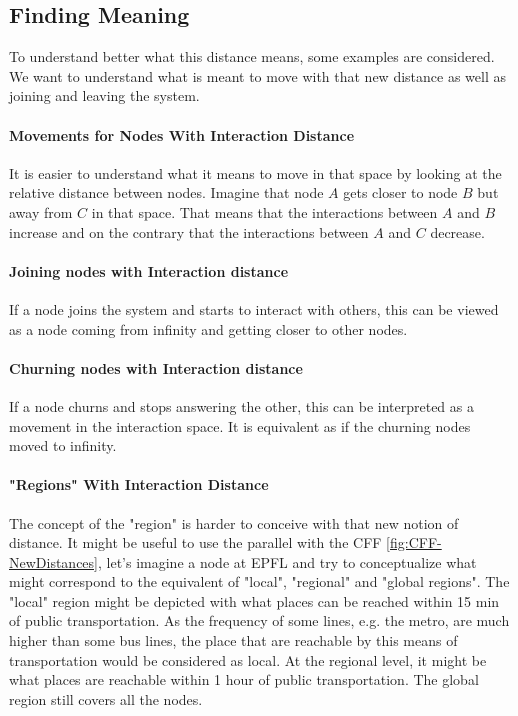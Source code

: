 \documentclass[a4paper,11pt,twoside=semi,openright]{report}
\begin{document}
\subsection{Finding Meaning}
To understand better what this distance means, some examples are
considered. We want to understand what is meant to move with that new distance as
well as joining and leaving the system. 

\paragraph{Movements for Nodes With Interaction Distance}
It is easier to understand what it means to move in that space by looking at
the relative distance between nodes. Imagine that node $A$ gets closer to node
$B$ but away from $C$ in that space. That means that the interactions between
$A$ and $B$ increase and on the contrary that the interactions between $A$ and
$C$ decrease.

\paragraph{Joining nodes with Interaction distance}
If a node joins the system and starts to interact with others, this can be
viewed as a node coming from infinity and getting closer to other
nodes.

\paragraph{Churning nodes with Interaction distance}
If a node churns and stops answering the other, this can be interpreted as a
movement in the interaction space. It is equivalent as if the churning nodes moved
to infinity.  

\paragraph{"Regions" With Interaction Distance} \label{par:section-example}
The concept of the "region" is harder to conceive with that new notion of
distance. It might be useful to use the parallel with the CFF
\autoref{fig:CFF-NewDistances}, let's imagine a node at EPFL and try to
conceptualize what might correspond to the equivalent of "local", "regional" and "global regions". The "local" region might be depicted with what places can
be reached within 15 min of public transportation. As the frequency of some lines, e.g. the metro, are much higher than some bus lines, the place that are reachable by this means of transportation would be considered as local. At the regional level, it might be what
places are reachable within 1 hour of public transportation. The global region still
covers all the nodes.
\end{document}
